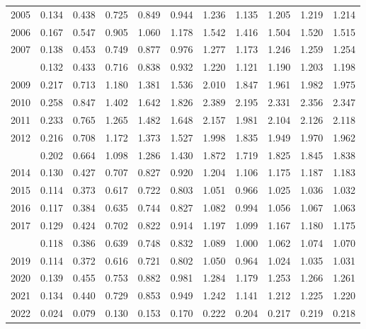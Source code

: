 \documentclass[
]{article}
\begin{document}
\begin{longtable}[t]{lrrrrrrrrrr}
2005 & 0.134 & 0.438 & 0.725 & 0.849 & 0.944 & 1.236 & 1.135 & 1.205 & 1.219 & 1.214\\
2006 & 0.167 & 0.547 & 0.905 & 1.060 & 1.178 & 1.542 & 1.416 & 1.504 & 1.520 & 1.515\\
2007 & 0.138 & 0.453 & 0.749 & 0.877 & 0.976 & 1.277 & 1.173 & 1.246 & 1.259 & 1.254\\
\addlinespace
2008 & 0.132 & 0.433 & 0.716 & 0.838 & 0.932 & 1.220 & 1.121 & 1.190 & 1.203 & 1.198\\
2009 & 0.217 & 0.713 & 1.180 & 1.381 & 1.536 & 2.010 & 1.847 & 1.961 & 1.982 & 1.975\\
2010 & 0.258 & 0.847 & 1.402 & 1.642 & 1.826 & 2.389 & 2.195 & 2.331 & 2.356 & 2.347\\
2011 & 0.233 & 0.765 & 1.265 & 1.482 & 1.648 & 2.157 & 1.981 & 2.104 & 2.126 & 2.118\\
2012 & 0.216 & 0.708 & 1.172 & 1.373 & 1.527 & 1.998 & 1.835 & 1.949 & 1.970 & 1.962\\
\addlinespace
2013 & 0.202 & 0.664 & 1.098 & 1.286 & 1.430 & 1.872 & 1.719 & 1.825 & 1.845 & 1.838\\
2014 & 0.130 & 0.427 & 0.707 & 0.827 & 0.920 & 1.204 & 1.106 & 1.175 & 1.187 & 1.183\\
2015 & 0.114 & 0.373 & 0.617 & 0.722 & 0.803 & 1.051 & 0.966 & 1.025 & 1.036 & 1.032\\
2016 & 0.117 & 0.384 & 0.635 & 0.744 & 0.827 & 1.082 & 0.994 & 1.056 & 1.067 & 1.063\\
2017 & 0.129 & 0.424 & 0.702 & 0.822 & 0.914 & 1.197 & 1.099 & 1.167 & 1.180 & 1.175\\
\addlinespace
2018 & 0.118 & 0.386 & 0.639 & 0.748 & 0.832 & 1.089 & 1.000 & 1.062 & 1.074 & 1.070\\
2019 & 0.114 & 0.372 & 0.616 & 0.721 & 0.802 & 1.050 & 0.964 & 1.024 & 1.035 & 1.031\\
2020 & 0.139 & 0.455 & 0.753 & 0.882 & 0.981 & 1.284 & 1.179 & 1.253 & 1.266 & 1.261\\
2021 & 0.134 & 0.440 & 0.729 & 0.853 & 0.949 & 1.242 & 1.141 & 1.212 & 1.225 & 1.220\\
2022 & 0.024 & 0.079 & 0.130 & 0.153 & 0.170 & 0.222 & 0.204 & 0.217 & 0.219 & 0.218\\*
\end{longtable}
\end{document}
